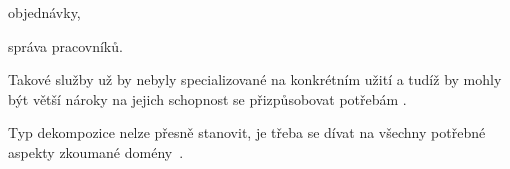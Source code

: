 \begin{ul}
   \item objednávky,
   \item správa pracovníků.
\end{ul}


Takové služby už by nebyly specializované na konkrétním užití a tudíž by mohly být větší nároky na jejich schopnost se přizpůsobovat potřebám .

Typ dekompozice nelze přesně stanovit, je třeba se dívat na všechny potřebné aspekty zkoumané domény~\cite{msachris}.

